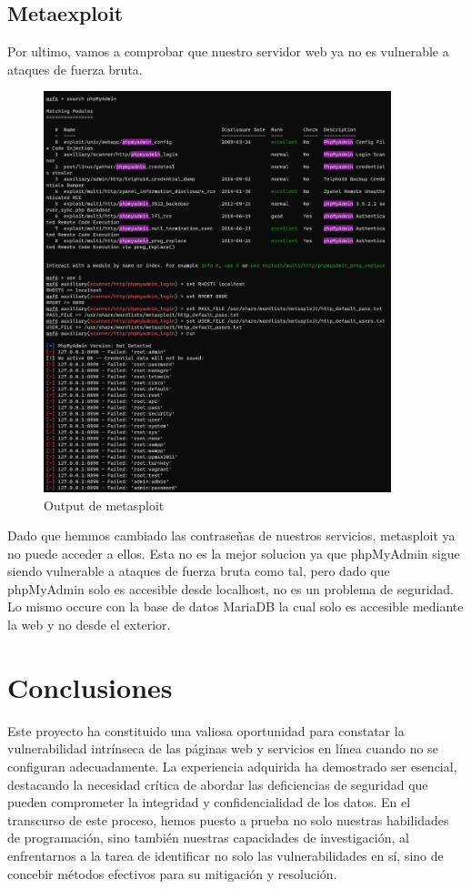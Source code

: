 \documentclass{report}
\begin{document}
        \section{Metaexploit}
            Por ultimo, vamos a comprobar que nuestro servidor web ya no es vulnerable a ataques de fuerza bruta.
            \begin{figure}[H]
                \centering
                \includegraphics[width=0.9\textwidth]{./img/audit2/msf1.png}
                \caption{Output de metasploit}
            \end{figure}
            Dado que hemmos cambiado las contraseñas de nuestros servicios, metasploit ya no puede acceder a ellos.
            Esta no es la mejor solucion ya que phpMyAdmin sigue siendo vulnerable a ataques de fuerza bruta como tal, pero dado que phpMyAdmin solo es accesible desde localhost, no es un problema de seguridad.
            Lo mismo occure con la base de datos MariaDB la cual solo es accesible mediante la web y no desde el exterior.
        \clearpage
    \chapter{Conclusiones}
        Este proyecto ha constituido una valiosa oportunidad para constatar la vulnerabilidad intrínseca de las páginas web y servicios en línea cuando no se configuran adecuadamente. La experiencia adquirida ha demostrado ser esencial, destacando la necesidad crítica de abordar las deficiencias de seguridad que pueden comprometer la integridad y confidencialidad de los datos. En el transcurso de este proceso, hemos puesto a prueba no solo nuestras habilidades de programación, sino también nuestras capacidades de investigación, al enfrentarnos a la tarea de identificar no solo las vulnerabilidades en sí, sino de concebir métodos efectivos para su mitigación y resolución.
        
\end{document}
